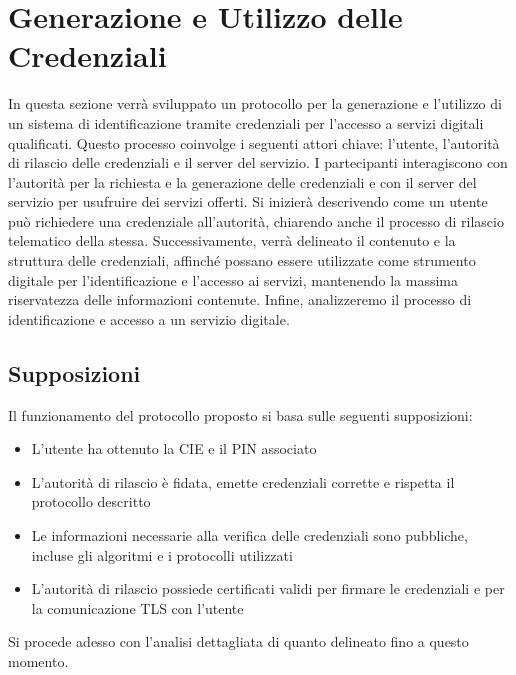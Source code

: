     \section{Generazione e Utilizzo delle Credenziali}
        In questa sezione verrà sviluppato un protocollo per la generazione e l'utilizzo di un sistema di identificazione tramite credenziali per l'accesso a servizi digitali qualificati.
        Questo processo coinvolge i seguenti attori chiave: l'utente, l'autorità di rilascio delle credenziali e il server del servizio.
        I partecipanti interagiscono con l'autorità per la richiesta e la generazione delle credenziali e con il server del servizio per usufruire dei servizi offerti.
        Si inizierà descrivendo come un utente può richiedere una credenziale all'autorità, chiarendo anche il processo di rilascio telematico della stessa.
        Successivamente, verrà delineato il contenuto e la struttura delle credenziali, affinché possano essere utilizzate come strumento digitale per l'identificazione e l'accesso ai servizi, mantenendo la massima riservatezza delle informazioni contenute.
        Infine, analizzeremo il processo di identificazione e accesso a un servizio digitale.
                
        \subsection{Supposizioni}
            Il funzionamento del protocollo proposto si basa sulle seguenti supposizioni:

            \begin{itemize}
                \item L'utente ha ottenuto la CIE e il PIN associato

                \item L'autorità di rilascio è fidata, emette credenziali corrette e rispetta il protocollo descritto

                \item Le informazioni necessarie alla verifica delle credenziali sono pubbliche, incluse gli algoritmi e i protocolli utilizzati

                \item L'autorità di rilascio possiede certificati validi per firmare le credenziali e per la comunicazione TLS con l'utente
            \end{itemize}

    \noindent Si procede adesso con l’analisi dettagliata di quanto delineato fino a questo momento.


